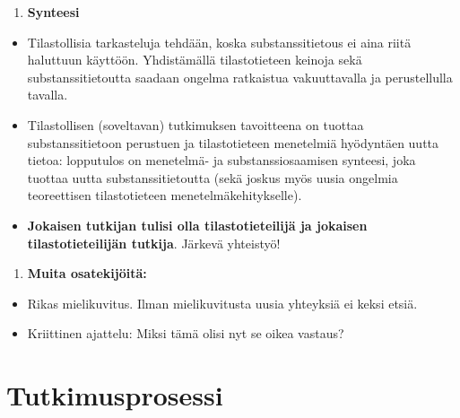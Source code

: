 \documentclass[
]{book}
\providecommand{\tightlist}{%
  \setlength{\itemsep}{0pt}\setlength{\parskip}{0pt}}
\begin{document}
\begin{enumerate}
\def\labelenumi{\arabic{enumi}.}
\setcounter{enumi}{3}
\tightlist
\item
  \textbf{Synteesi}
\end{enumerate}

\begin{itemize}
\tightlist
\item
  Tilastollisia tarkasteluja tehdään, koska substanssitietous ei aina riitä haluttuun käyttöön. Yhdistämällä tilastotieteen keinoja sekä substanssitietoutta saadaan ongelma ratkaistua vakuuttavalla ja perustellulla tavalla.
\item
  Tilastollisen (soveltavan) tutkimuksen tavoitteena on tuottaa substanssitietoon perustuen ja tilastotieteen menetelmiä hyödyntäen uutta tietoa: lopputulos on menetelmä- ja substanssiosaamisen synteesi, joka tuottaa uutta substanssitietoutta (sekä joskus myös uusia ongelmia teoreettisen tilastotieteen menetelmäkehitykselle).
\item
  \textbf{Jokaisen tutkijan tulisi olla tilastotieteilijä ja jokaisen tilastotieteilijän tutkija}. Järkevä yhteistyö!
\end{itemize}

\begin{enumerate}
\def\labelenumi{\arabic{enumi}.}
\setcounter{enumi}{4}
\tightlist
\item
  \textbf{Muita osatekijöitä:}
\end{enumerate}

\begin{itemize}
\tightlist
\item
  Rikas mielikuvitus. Ilman mielikuvitusta uusia yhteyksiä ei keksi etsiä.
\item
  Kriittinen ajattelu: Miksi tämä olisi nyt se oikea vastaus?
\end{itemize}

\hypertarget{alaluku112}{%
\section{Tutkimusprosessi}\label{alaluku112}}
\end{document}
